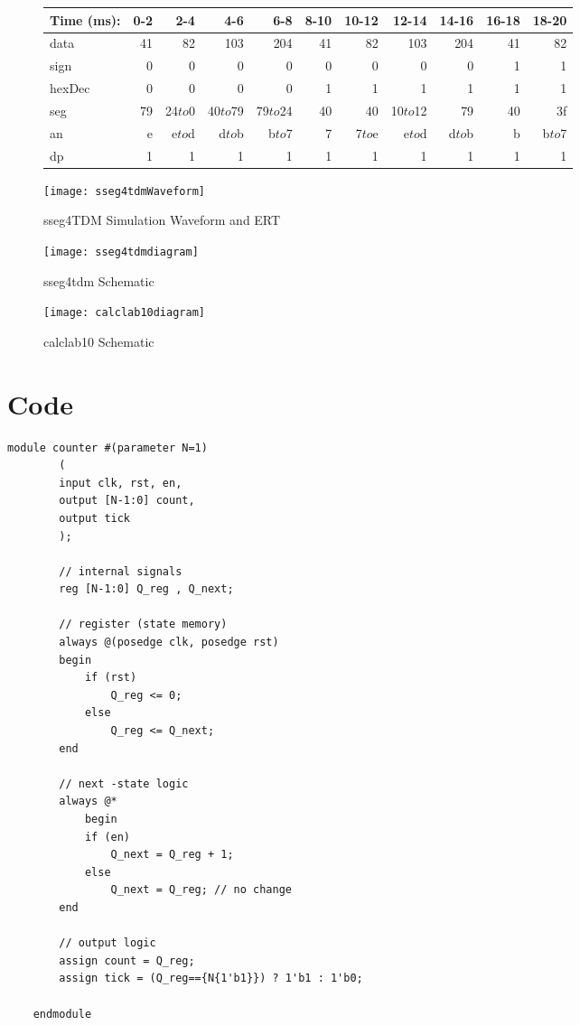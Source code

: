 \documentclass[11pt]{article}
\begin{document}
\begin{figure}[ht]\centering
	
	\begin{tabular}{l|rrrrrrrrrr}
		Time (ms): & 0-2 & 2-4 & 4-6 & 6-8 & 8-10 & 10-12 & 12-14 & 14-16 & 16-18 & 18-20\\
		\midrule
		data  & 41 & 82 & 103      & 204 & 41 & 	  82 & 103 & 	   204 & 41 & 82 \\
		sign  & 0 & 0 & 0      & 0 & 0 &   	  0 & 0 & 	   0 & 1 & 1 \\
		hexDec & 0& 0 & 0      & 0 & 1 &      1 & 1 &      1 & 1 & 1 \\ 
		\midrule
		seg   & 79 & 24$to$0 & 40$to$79 & 79$to$24 & 40 & 40 & 10$to$12 & 79 & 40 & 3f \\
		an    & e  & e$to$d & d$to$b & b$to$7 & 7 & 7$to$e & e$to$d & d$to$b & b & b$to$7 \\
		dp    & 1  & 1      & 1      & 1      & 1 &      1 & 1      & 1      & 1 & 1      \\ 
		\bottomrule
	\end{tabular}
	\bigskip
	\texttt{[image: sseg4tdmWaveform]}
	\caption{sseg4TDM Simulation Waveform and ERT}
	\label{fig:sim_with_table}
\end{figure}

\begin{figure}[ht]\centering
	\texttt{[image: sseg4tdmdiagram]}
	\caption{sseg4tdm Schematic}
	\label{fig:sim_with_table}
\end{figure}

\begin{figure}[ht]\centering
	\texttt{[image: calclab10diagram]}
	\caption{calclab10 Schematic}
	\label{fig:sim_with_table}
\end{figure}

\clearpage
\section*{Code}

\begin{lstlisting}[style=Verilog,
caption=Counter Source Code,
label=MUX w/ two inputs Source Code
]
	module counter #(parameter N=1) 
		( 
		input clk, rst, en,
		output [N-1:0] count, 
		output tick 
		);
		
		// internal signals
		reg [N-1:0] Q_reg , Q_next;
		
		// register (state memory)
		always @(posedge clk, posedge rst) 
		begin
			if (rst) 
				Q_reg <= 0; 
			else
				Q_reg <= Q_next;
		end
		
		// next -state logic 
		always @* 
			begin 
			if (en) 
				Q_next = Q_reg + 1; 
			else 
				Q_next = Q_reg; // no change 
		end
		
		// output logic 
		assign count = Q_reg; 
		assign tick = (Q_reg=={N{1'b1}}) ? 1'b1 : 1'b0;
	
	endmodule
\end{lstlisting}
\clearpage
\end{document}
